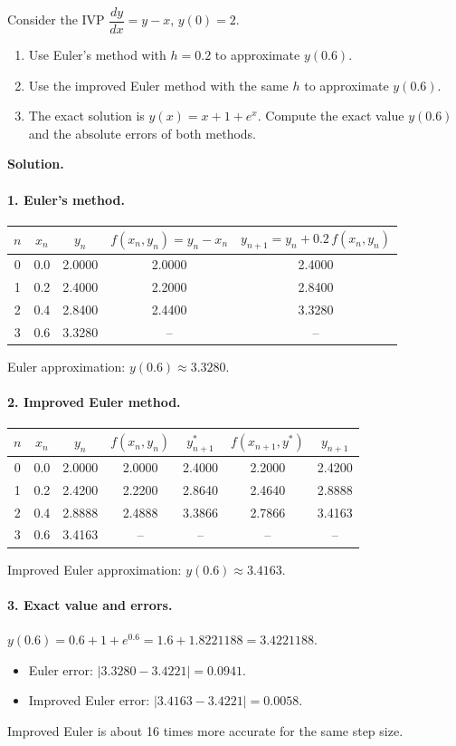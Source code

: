 \documentclass[11pt]{article}
\begin{document}
\begin{exoresolu}
Consider the IVP $\dfrac{dy}{dx} = y - x$, $y(0)=2$.
\begin{enumerate}
\item Use Euler's method with $h=0.2$ to approximate $y(0.6)$.
\item Use the improved Euler method with the same $h$ to approximate $y(0.6)$.
\item The exact solution is $y(x)=x+1+e^x$.  Compute the exact value $y(0.6)$ and the absolute errors of both methods.
\end{enumerate}
\tcblower
\textbf{Solution.}
\paragraph{1. Euler's method.}
\begin{center}
\begin{tabular}{|c|c|c|c|c|}\hline
$n$ & $x_n$ & $y_n$ & $f(x_n,y_n)=y_n-x_n$ & $y_{n+1}=y_n+0.2\,f(x_n,y_n)$ \\ \hline
0 & 0.0 & 2.0000 & 2.0000 & 2.4000 \\
1 & 0.2 & 2.4000 & 2.2000 & 2.8400 \\
2 & 0.4 & 2.8400 & 2.4400 & 3.3280 \\
3 & 0.6 & 3.3280 & -- & -- \\ \hline
\end{tabular}
\end{center}
Euler approximation: $y(0.6)\approx 3.3280$.

\paragraph{2. Improved Euler method.}
\begin{center}
\begin{tabular}{|c|c|c|c|c|c|c|}\hline
$n$ & $x_n$ & $y_n$ & $f(x_n,y_n)$ & $y^*_{n+1}$ & $f(x_{n+1},y^*)$ & $y_{n+1}$ \\ \hline
0 & 0.0 & 2.0000 & 2.0000 & 2.4000 & 2.2000 & 2.4200 \\
1 & 0.2 & 2.4200 & 2.2200 & 2.8640 & 2.4640 & 2.8888 \\
2 & 0.4 & 2.8888 & 2.4888 & 3.3866 & 2.7866 & 3.4163 \\
3 & 0.6 & 3.4163 & -- & -- & -- & -- \\ \hline
\end{tabular}
\end{center}
Improved Euler approximation: $y(0.6)\approx 3.4163$.

\paragraph{3. Exact value and errors.}
$y(0.6)=0.6+1+e^{0.6}=1.6+1.8221188=3.4221188$.
\begin{itemize}
\item Euler error: $|3.3280-3.4221| = 0.0941$.
\item Improved Euler error: $|3.4163-3.4221| = 0.0058$.
\end{itemize}
Improved Euler is about 16 times more accurate for the same step size.
\end{exoresolu}
\end{document}
